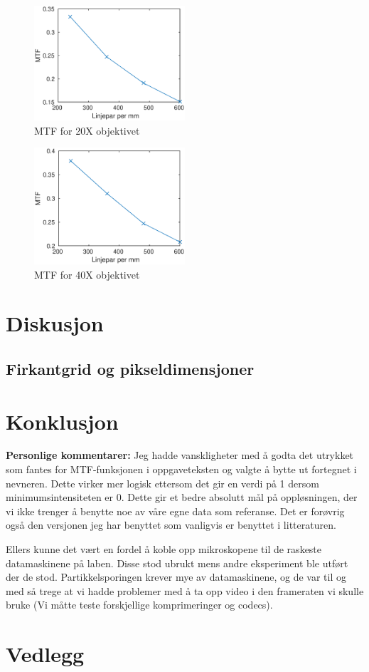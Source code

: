 \documentclass[a4paper,11pt, twocolumn]{article}
\begin{document}
\begin{figure}[!ht]
	\centering
	\includegraphics[width = 0.5\textwidth]{Lab/MTF/MTF20X.eps}
	\caption{MTF for 20X objektivet}
	\label{fig:MTF20X}
\end{figure}
\begin{figure}[!ht]
	\centering
	\includegraphics[width = 0.5\textwidth]{Lab/MTF/MTF40X.eps}
	\caption{MTF for 40X objektivet}
	\label{fig:MTF40X}
\end{figure}

\section{Diskusjon}
\subsection{Firkantgrid og pikseldimensjoner}
\section{Konklusjon}

{\bf Personlige kommentarer:} Jeg hadde vanskligheter med å godta det utrykket som fantes for MTF-funksjonen i oppgaveteksten og valgte å bytte ut fortegnet i nevneren. Dette virker mer logisk ettersom det gir en verdi på 1 dersom minimumsintensiteten er 0. Dette gir et bedre absolutt mål på oppløsningen, der vi ikke trenger å benytte noe av våre egne data som referanse. Det er forøvrig også den versjonen jeg har benyttet som vanligvis er benyttet i litteraturen. 

Ellers kunne det vært en fordel å koble opp mikroskopene til de raskeste datamaskinene på laben. Disse stod ubrukt mens andre eksperiment ble utført der de stod. Partikkelsporingen krever mye av datamaskinene, og de var til og med så trege at vi hadde problemer med å ta opp video i den frameraten vi skulle bruke (Vi måtte teste forskjellige komprimeringer og codecs).

\printbibliography{}
\clearpage
\onecolumn
\appendix

\section{Vedlegg}
\end{document}

